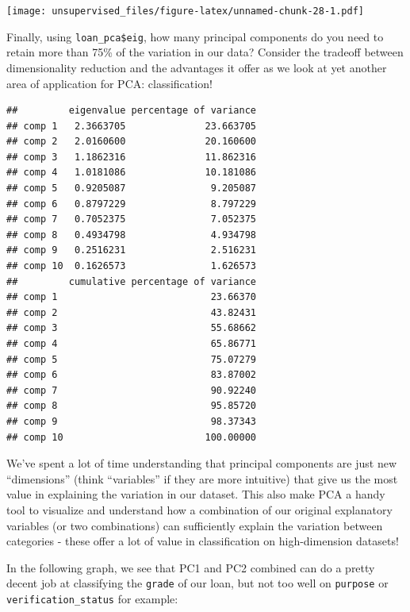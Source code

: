 \documentclass[]{article}
\newenvironment{Shaded}{\begin{snugshade}}{\end{snugshade}}
\newcommand{\NormalTok}[1]{#1}
\newcommand{\OperatorTok}[1]{\textcolor[rgb]{0.81,0.36,0.00}{\textbf{#1}}}
\begin{document}
\texttt{[image: unsupervised\_files/figure-latex/unnamed-chunk-28-1.pdf]}

Finally, using \texttt{loan\_pca\$eig}, how many principal components do
you need to retain more than 75\% of the variation in our data? Consider
the tradeoff between dimensionality reduction and the advantages it
offer as we look at yet another area of application for PCA:
classification!

\begin{Shaded}
\end{Shaded}

\begin{verbatim}
##         eigenvalue percentage of variance
## comp 1   2.3663705              23.663705
## comp 2   2.0160600              20.160600
## comp 3   1.1862316              11.862316
## comp 4   1.0181086              10.181086
## comp 5   0.9205087               9.205087
## comp 6   0.8797229               8.797229
## comp 7   0.7052375               7.052375
## comp 8   0.4934798               4.934798
## comp 9   0.2516231               2.516231
## comp 10  0.1626573               1.626573
##         cumulative percentage of variance
## comp 1                           23.66370
## comp 2                           43.82431
## comp 3                           55.68662
## comp 4                           65.86771
## comp 5                           75.07279
## comp 6                           83.87002
## comp 7                           90.92240
## comp 8                           95.85720
## comp 9                           98.37343
## comp 10                         100.00000
\end{verbatim}

We've spent a lot of time understanding that principal components are
just new ``dimensions'' (think ``variables'' if they are more intuitive)
that give us the most value in explaining the variation in our dataset.
This also make PCA a handy tool to visualize and understand how a
combination of our original explanatory variables (or two combinations)
can sufficiently explain the variation between categories - these offer
a lot of value in classification on high-dimension datasets!

In the following graph, we see that PC1 and PC2 combined can do a pretty
decent job at classifying the \texttt{grade} of our loan, but not too
well on \texttt{purpose} or \texttt{verification\_status} for example:
\end{document}
